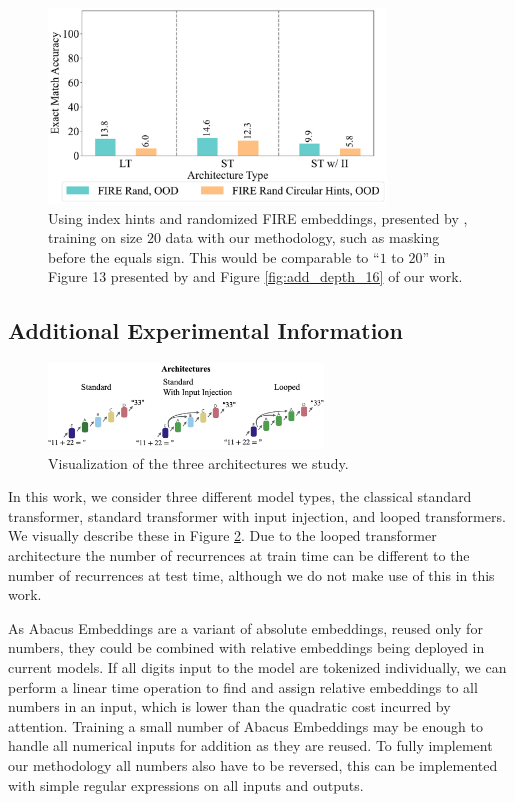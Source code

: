\documentclass{article}
\begin{document}
\begin{figure}[ht!]
    \centering
    \includegraphics[width=0.8\textwidth]{Figures/plot_ten_2_bars.pdf}
    \caption{
    Using index hints and randomized FIRE embeddings, presented by \citet{zhou2024transformers}, training on size \(20\) data with our methodology, such as masking before the equals sign.
    This would be comparable to ``\(1\) to \(20\)'' in Figure 13 presented by \citet{zhou2024transformers} and Figure \ref{fig:add_depth_16} of our work.
    }
    \label{fig:app_index_hints}
\end{figure}

\subsection{Additional Experimental Information}
\label{app-subsec:set-up}
\begin{figure}[ht!] %
    \centering
    \includegraphics[width=0.65\textwidth]{Figures/archs.001.png}
    \caption{
    Visualization of the three architectures we study.
    }
    \label{fig:models}
\end{figure}

In this work, we consider three different model types, the classical standard  transformer, standard transformer with input injection, and looped transformers.
We visually describe these in Figure \ref{fig:models}.
Due to the looped transformer architecture the number of recurrences at train time can be different to the number of recurrences at test time, although we do not make use of this in this work.

As Abacus Embeddings are a variant of absolute embeddings, reused only for numbers, they could be combined with relative embeddings being deployed in current models.
If all digits input to the model are tokenized individually, we can perform a linear time operation to find and assign relative embeddings to all numbers in an input, which is lower than the quadratic cost incurred by attention.
Training a small number of Abacus Embeddings may be enough to handle all numerical inputs for addition as they are reused.
To fully implement our methodology all numbers also have to be reversed, this can be implemented with simple regular expressions on all inputs and outputs.
\end{document}
